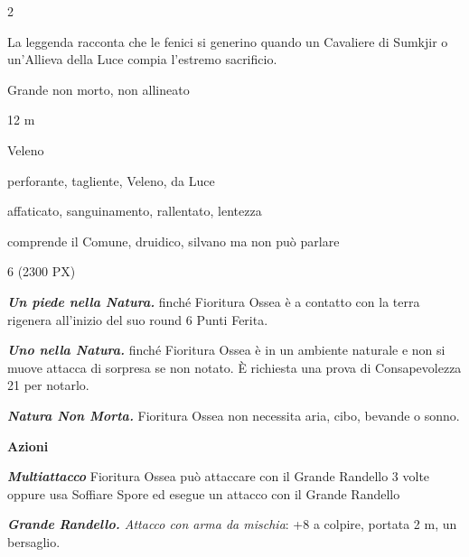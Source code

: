 \begin{multicols}{2}
{La leggenda racconta che le fenici si generino quando un Cavaliere di Sumkjir o un'Allieva della Luce compia l'estremo sacrificio.

\begin{description}[noitemsep, topsep=0pt, parsep=0pt, partopsep=0pt, itemsep=1pt, leftmargin=2.35cm,  labelwidth=2.2cm, itemindent=0cm, listparindent=0pt] %
\setlength{\baselineskip}{10pt}
\item[\textbf{Taglia/Tipo}] Grande non morto, non allineato
\item[\textbf{Caratt.}] 
\item[\textbf{Punti Ferita}] 
\item[\textbf{Movimento}] 12 m
\item[\textbf{Tiri Salvez.}] 
\item[\textbf{Imm. Danni}] Veleno
\item[\textbf{Res. Danni}] perforante, tagliente, Veleno, da Luce
\item[\textbf{Immunità}] affaticato, sanguinamento, rallentato, lentezza
\item[\textbf{Sensi}] 
\item[\textbf{Linguaggi}] comprende il Comune, druidico, silvano ma non può parlare
\item[\textbf{Sfida}] 6 (2300 PX)
\end{description}
\smallskip

\emph{\textbf{Un piede nella Natura.}} finché Fioritura Ossea è a contatto con la terra rigenera all'inizio del suo round 6 Punti Ferita.

\emph{\textbf{Uno nella Natura.}} finché Fioritura Ossea è in un ambiente naturale e non si muove attacca di sorpresa se non notato. È richiesta una prova di Consapevolezza 21 per notarlo.

\emph{\textbf{Natura Non Morta.}} Fioritura Ossea non necessita aria, cibo, bevande o sonno.

\textbf{Azioni}

\emph{\textbf{Multiattacco}} Fioritura Ossea può attaccare con il Grande Randello 3 volte oppure usa Soffiare Spore ed esegue un attacco con il Grande Randello

\emph{\textbf{Grande Randello.} Attacco con arma da mischia}: +8 a colpire, portata 2 m, un bersaglio.

}
\end{multicols}
